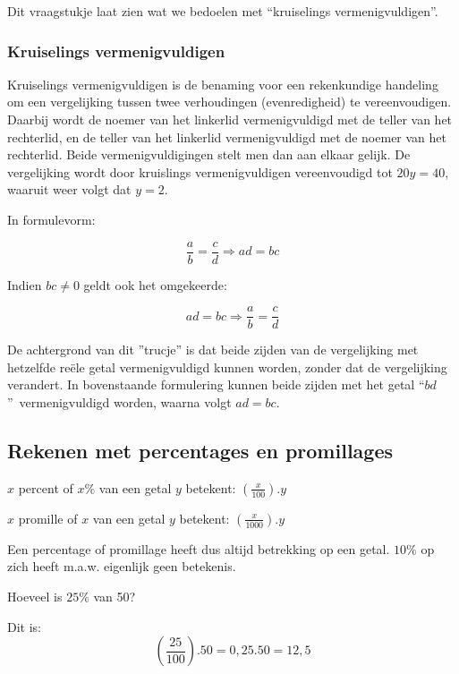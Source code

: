 Dit vraagstukje laat zien wat we bedoelen met ``kruiselings vermenigvuldigen''.

\subsubsection{Kruiselings vermenigvuldigen}

Kruiselings vermenigvuldigen is de benaming voor een rekenkundige handeling om een vergelijking tussen twee verhoudingen (evenredigheid) te vereenvoudigen. Daarbij wordt de noemer van het linkerlid vermenigvuldigd met de teller van het rechterlid, en de teller van het linkerlid vermenigvuldigd met de noemer van het rechterlid. Beide vermenigvuldigingen stelt men dan aan elkaar gelijk. De vergelijking  wordt door kruislings vermenigvuldigen vereenvoudigd tot $20y=40$, waaruit weer volgt dat $y=2$.

In formulevorm:

\begin{equation*}
\frac{a}{b} = \frac{c}{d} \Rightarrow ad = bc
\end{equation*}

Indien $bc \neq 0$ geldt ook het omgekeerde:

\begin{equation}
ad=bc \Rightarrow \frac{a}{b}=\frac{c}{d}
\end{equation}

De achtergrond van dit ''trucje'' is dat beide zijden van de vergelijking met hetzelfde re\"ele getal vermenigvuldigd kunnen worden, zonder dat de vergelijking verandert. In bovenstaande formulering kunnen beide zijden met het getal \textquotedblleft$bd$\textquotedblright\ vermenigvuldigd worden, waarna volgt $ad=bc$.

\subsection{Rekenen met percentages en promillages}

$x$ percent of $x\%$ van een getal $y$ betekent: ${\displaystyle \left(\frac{x}{100}\right).y}$

$x$ promille of $x$ \textpertenthousand van een getal $y$ betekent:
${\displaystyle \left(\frac{x}{1000}\right).y}$

Een percentage of promillage heeft dus altijd betrekking
op een getal. $10\%$ op zich heeft m.a.w. eigenlijk geen betekenis.


\begin{voorbeeld}
	Hoeveel is $25\%$ van 50? 
	
	Dit is: \begin{equation*}
	\left(\frac{25}{100}\right).50=0,25.50=12,5
	\end{equation*}
\end{voorbeeld}

